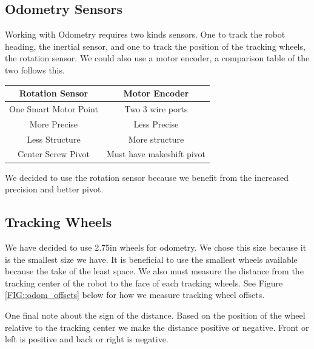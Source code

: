 \documentclass[12pt]{report}
\begin{document}
\subsection{Odometry Sensors}
    Working with Odometry requires two kinds sensors.
    One to track the robot heading, the inertial sensor, and one to track the position of the tracking wheels, the rotation sensor.
    We could also use a motor encoder, a comparison table of the two follows this.
    \begin{center}
        \begin{tabular}{c|c}
            Rotation Sensor & Motor Encoder \\
            \hline
            One Smart Motor Point & Two 3 wire ports \\
            More Precise & Less Precise \\
            Less Structure & More structure \\
            Center Screw Pivot & Must have makeshift pivot \\
        \end{tabular}

        We decided to use the rotation sensor because we benefit from the increased precision and better pivot.
    \end{center}

\subsection{Tracking Wheels}
We have decided to use 2.75in wheels for odometry.
We chose this size because it is the smallest size we have.
It is beneficial to use the smallest wheels available because the take of the least space.
We also must measure the distance from the tracking center of the robot to the face of each tracking wheels.
See Figure \ref{FIG::odom_offsets} below for how we measure tracking wheel offsets.

One final note about the sign of the distance.
Based on the position of the wheel relative to the tracking center we make the distance positive or negative.
Front or left is positive and back or right is negative.
\end{document}

